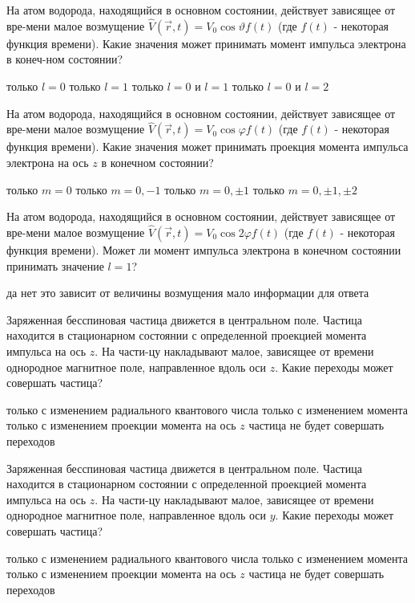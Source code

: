 \documentclass[11pt,a4paper]{exam}
\begin{document}
\begin{questions}
\question На атом водорода, находящийся в основном состоянии, действует зависящее от вре-мени малое возмущение $\hat V(\vec r,t) = {V_0}\cos \vartheta f(t)$ (где $f(t)$ - некоторая функция времени). Какие значения может принимать момент импульса электрона в конеч-ном состоянии?  
\begin{choices}
\choice только $l = 0$    
\choice только $l = 1$
\choice только $l = 0$ и $l = 1$   
\choice только $l = 0$ и $l = 2$
\end{choices}

\question На атом водорода, находящийся в основном состоянии, действует зависящее от вре-мени малое возмущение $\hat V(\vec r,t) = {V_0}\cos \varphi f(t)$ (где $f(t)$ - некоторая функция времени). Какие значения может принимать проекция момента импульса электрона на ось $z$ в конечном состоянии?  
\begin{choices}
\choice только $m = 0$    
\choice только $m = 0, - 1$
\choice только $m = 0, \pm 1$      
\choice только $m = 0, \pm 1, \pm 2$
\end{choices}

\question На атом водорода, находящийся в основном состоянии, действует зависящее от вре-мени малое возмущение $\hat V(\vec r,t) = {V_0}\cos 2\varphi f(t)$ (где $f(t)$ - некоторая функция времени). Может ли момент импульса электрона в конечном состоянии принимать значение $l = 1$? 
\begin{choices}
\choice да
\choice нет
\choice это зависит от величины возмущения
\choice мало информации для ответа
\end{choices}

\question Заряженная бесспиновая частица движется в центральном поле. Частица находится в стационарном состоянии с определенной проекцией момента импульса на ось $z$. На части-цу накладывают малое, зависящее от времени однородное магнитное поле, направленное вдоль оси $z$. Какие переходы может совершать частица?
\begin{choices}
\choice только с изменением радиального квантового числа
\choice только с изменением момента
\choice только с изменением проекции момента на ось $z$
\choice частица не будет совершать переходов 
\end{choices}

\question Заряженная бесспиновая частица движется в центральном поле. Частица находится в стационарном состоянии с определенной проекцией момента импульса на ось $z$. На части-цу накладывают малое, зависящее от времени однородное магнитное поле, направленное вдоль оси $y$. Какие переходы может совершать частица?
\begin{choices}
\choice только с изменением радиального квантового числа
\choice только с изменением момента
\choice только с изменением проекции момента на ось $z$
\choice частица не будет совершать переходов 
\end{choices}


\end{questions}
\end{document}
